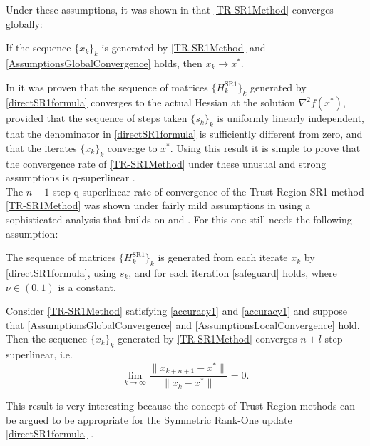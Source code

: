 Under these assumptions, it was shown in \cite{ByrdKhalfanSchnabel:1996} that \cref{TR-SR1Method} converges globally: 

\begin{theorem} \label{GlobalConvergence}
    If the sequence $\{ x_k \}_k$ is generated by \cref{TR-SR1Method} and \cref{AssumptionsGlobalConvergence} holds, then $x_k \rightarrow x^*$.
\end{theorem}

In \cite{ConnGouldToint:1991} it was proven that the sequence of matrices $\{ H^{\mathrm{SR1}}_k \}_k$ generated by \cref{directSR1formula} converges to the actual Hessian at the solution $\nabla^2 f(x^*)$, provided that the sequence of steps taken $\{ s_k \}_k$ is uniformly linearly independent, that the denominator in \cref{directSR1formula} is sufficiently different from zero, and that the iterates $\{ x_k \}_k$ converge to $x^*$. Using this result it is simple to prove that the convergence rate of \cref{TR-SR1Method} under these unusual and strong assumptions is q-superlinear \cite[p.~1026]{ByrdKhalfanSchnabel:1996}. \\
The $n+1$-step q-superlinear rate of convergence of the Trust-Region SR1 method \cref{TR-SR1Method} was shown under fairly mild assumptions in \cite{ByrdKhalfanSchnabel:1996} using a sophisticated analysis that builds on \cite{ConnGouldToint:1991} and \cite{KhalfanByrdSchnabel:1993}. For this one still needs the following assumption:

\begin{assumption}\label{AssumptionsLocalConvergence}
    The sequence of matrices $\{ H^{\mathrm{SR1}}_k \}_k$ is generated from each iterate $x_k$ by \cref{directSR1formula}, using $s_k$, and for each iteration \cref{safeguard} holds, where $\nu \in (0, 1)$ is a constant.
\end{assumption}

\begin{theorem} \label{LocalConvergence}
    Consider \cref{TR-SR1Method} satisfying \cref{accuracy1} and \cref{accuracy1} and suppose that \cref{AssumptionsGlobalConvergence} and \cref{AssumptionsLocalConvergence} hold. Then the sequence $\{ x_k \}_k$ generated by \cref{TR-SR1Method} converges $n+l$-step superlinear, i.e. 
    \begin{equation}\label{n+1superlinear}
        \lim_{k \rightarrow \infty} \frac{\lVert x_{k+n+1} - x^* \rVert}{\lVert x_k - x^* \rVert} = 0.
    \end{equation}
\end{theorem}

This result is very interesting  because the concept of Trust-Region methods can be argued to be appropriate for the Symmetric Rank-One update \cref{directSR1formula} \cite[p.~1025]{ByrdKhalfanSchnabel:1996}.
